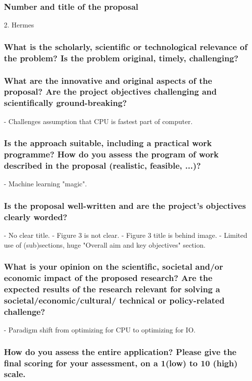 \subsubsection*{Number and title of the proposal}
2. Hermes

\subsubsection*{What is the scholarly, scientific or technological relevance of the problem? Is the problem original, timely, challenging?}

\subsubsection*{What are the innovative and original aspects of the proposal? Are the project objectives challenging and scientifically ground-breaking?}
- Challenges assumption that CPU is fastest part of computer.

\subsubsection*{Is the approach suitable, including a practical work programme? How do you assess the program of work described in the proposal (realistic, feasible, ...)?}
- Machine learning "magic".

\subsubsection*{Is the proposal well-written and are the project’s objectives clearly worded?}
- No clear title.
- Figure 3 is not clear.
- Figure 3 title is behind image.
- Limited use of (sub)sections, huge "Overall aim and key objectives" section.

\subsubsection*{What is your opinion on the scientific, societal and/or economic impact of the proposed research? Are the expected results of the research relevant for solving a societal/economic/cultural/ technical or policy-related challenge?}
- Paradigm shift from optimizing for CPU to optimizing for IO.

\subsubsection*{How do you assess the entire application? Please give the final scoring for your assessment, on a 1(low) to 10 (high) scale.}

